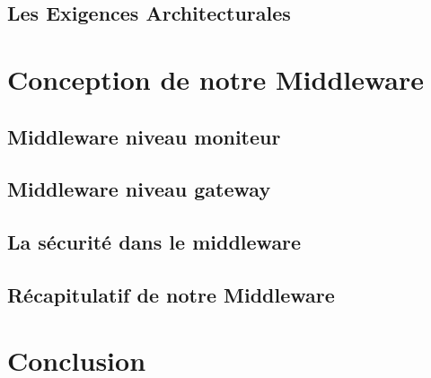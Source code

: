 \documentclass{article}
\begin{document}
\subsection{Les Exigences Architecturales}


\section{Conception de notre Middleware}
\subsection{Middleware niveau moniteur}

\subsection{Middleware niveau gateway}

\subsection{La sécurité dans le middleware}

\subsection{Récapitulatif de notre Middleware}


%

\section{ Conclusion }

 







\end{document}
